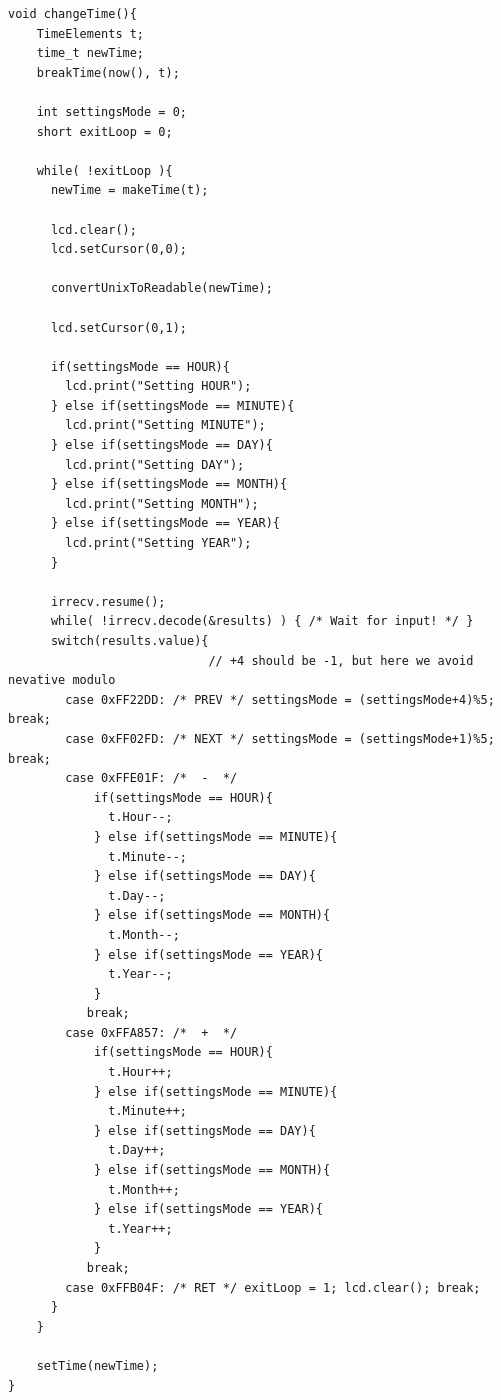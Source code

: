 \documentclass[a4paper,11pt]{article}
\theoremstyle{mytheor}
\begin{document}
\begin{lstlisting}
void changeTime(){
    TimeElements t;
    time_t newTime;
    breakTime(now(), t);
    
    int settingsMode = 0;
    short exitLoop = 0;

    while( !exitLoop ){
      newTime = makeTime(t);
  
      lcd.clear();
      lcd.setCursor(0,0);

      convertUnixToReadable(newTime);
    
      lcd.setCursor(0,1);
      
      if(settingsMode == HOUR){
        lcd.print("Setting HOUR");
      } else if(settingsMode == MINUTE){
        lcd.print("Setting MINUTE");
      } else if(settingsMode == DAY){
        lcd.print("Setting DAY");
      } else if(settingsMode == MONTH){
        lcd.print("Setting MONTH");
      } else if(settingsMode == YEAR){
        lcd.print("Setting YEAR");
      }

      irrecv.resume();
      while( !irrecv.decode(&results) ) { /* Wait for input! */ }
      switch(results.value){
                            // +4 should be -1, but here we avoid nevative modulo
        case 0xFF22DD: /* PREV */ settingsMode = (settingsMode+4)%5;       break;
        case 0xFF02FD: /* NEXT */ settingsMode = (settingsMode+1)%5;       break;
        case 0xFFE01F: /*  -  */
            if(settingsMode == HOUR){
              t.Hour--;
            } else if(settingsMode == MINUTE){
              t.Minute--;
            } else if(settingsMode == DAY){
              t.Day--;
            } else if(settingsMode == MONTH){
              t.Month--;
            } else if(settingsMode == YEAR){
              t.Year--;
            }
           break;
        case 0xFFA857: /*  +  */
            if(settingsMode == HOUR){
              t.Hour++;
            } else if(settingsMode == MINUTE){
              t.Minute++;
            } else if(settingsMode == DAY){
              t.Day++;
            } else if(settingsMode == MONTH){
              t.Month++;
            } else if(settingsMode == YEAR){
              t.Year++;
            }
           break;
        case 0xFFB04F: /* RET */ exitLoop = 1; lcd.clear(); break;
      }
    }

    setTime(newTime);
}
\end{lstlisting}
\end{document}
